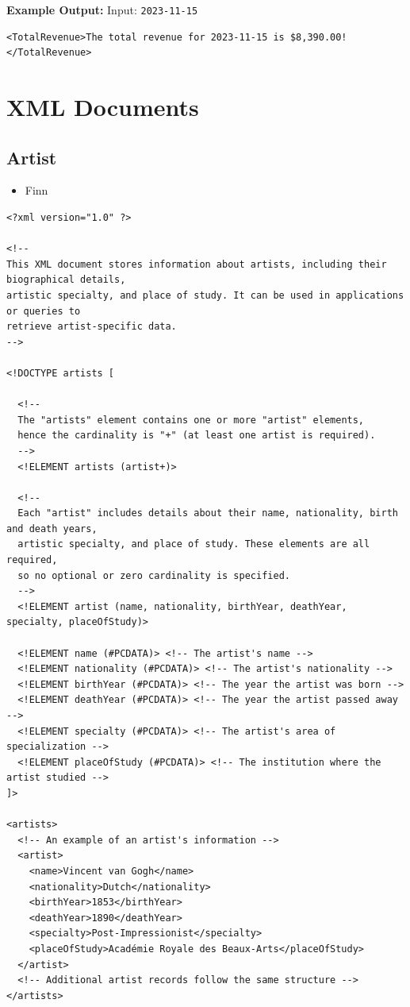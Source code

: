 \documentclass{article} %
\begin{document}
\textbf{Example Output:}  
Input: \texttt{2023-11-15}  
\begin{verbatim}
<TotalRevenue>The total revenue for 2023-11-15 is $8,390.00!</TotalRevenue>
\end{verbatim}

\newpage
\section{XML Documents}

\subsection{Artist}

\begin{itemize}
    \item Finn
\end{itemize}

\begin{verbatim}
<?xml version="1.0" ?>

<!-- 
This XML document stores information about artists, including their biographical details, 
artistic specialty, and place of study. It can be used in applications or queries to 
retrieve artist-specific data.
-->

<!DOCTYPE artists [
  
  <!-- 
  The "artists" element contains one or more "artist" elements, 
  hence the cardinality is "+" (at least one artist is required). 
  -->
  <!ELEMENT artists (artist+)>
  
  <!-- 
  Each "artist" includes details about their name, nationality, birth and death years, 
  artistic specialty, and place of study. These elements are all required, 
  so no optional or zero cardinality is specified.
  -->
  <!ELEMENT artist (name, nationality, birthYear, deathYear, specialty, placeOfStudy)>
  
  <!ELEMENT name (#PCDATA)> <!-- The artist's name -->
  <!ELEMENT nationality (#PCDATA)> <!-- The artist's nationality -->
  <!ELEMENT birthYear (#PCDATA)> <!-- The year the artist was born -->
  <!ELEMENT deathYear (#PCDATA)> <!-- The year the artist passed away -->
  <!ELEMENT specialty (#PCDATA)> <!-- The artist's area of specialization -->
  <!ELEMENT placeOfStudy (#PCDATA)> <!-- The institution where the artist studied -->
]>

<artists>
  <!-- An example of an artist's information -->
  <artist>
    <name>Vincent van Gogh</name>
    <nationality>Dutch</nationality>
    <birthYear>1853</birthYear>
    <deathYear>1890</deathYear>
    <specialty>Post-Impressionist</specialty>
    <placeOfStudy>Académie Royale des Beaux-Arts</placeOfStudy>
  </artist>
  <!-- Additional artist records follow the same structure -->
</artists>

\end{verbatim}
\end{document}
